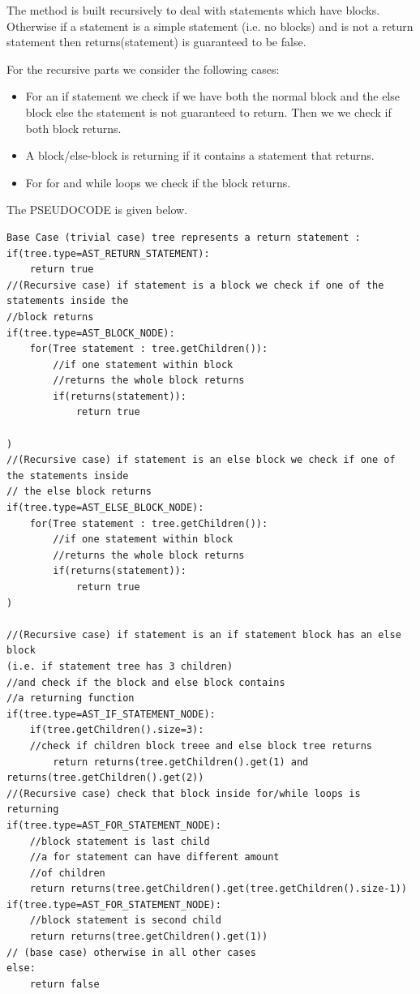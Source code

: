 The method is built recursively to deal with statements which have blocks. Otherwise if a statement is a simple statement (i.e. no blocks) and is not a return statement then returns(statement) is guaranteed to be false.

For the recursive parts we consider the following cases:
\begin{itemize}
    \item For an if statement we check if we have both the normal block and the else block else the statement is not guaranteed to return. Then we we check if both block returns.
    \item A block/else-block is returning if it contains a statement that returns.
    \item For for and while loops we check if the block returns.
\end{itemize}


The PSEUDOCODE is given below.

\begin{lstlisting}[caption=PSEUDOCODE: \textbf{Defining predicate \emph{returns(Tree tree)}}]
Base Case (trivial case) tree represents a return statement :
if(tree.type=AST_RETURN_STATEMENT):
    return true
//(Recursive case) if statement is a block we check if one of the statements inside the
//block returns
if(tree.type=AST_BLOCK_NODE):
    for(Tree statement : tree.getChildren()):
        //if one statement within block
        //returns the whole block returns
        if(returns(statement)):
            return true
        
)
//(Recursive case) if statement is an else block we check if one of the statements inside
// the else block returns
if(tree.type=AST_ELSE_BLOCK_NODE):
    for(Tree statement : tree.getChildren()):
        //if one statement within block
        //returns the whole block returns
        if(returns(statement)):
            return true
)

//(Recursive case) if statement is an if statement block has an else block
(i.e. if statement tree has 3 children)
//and check if the block and else block contains
//a returning function
if(tree.type=AST_IF_STATEMENT_NODE):
    if(tree.getChildren().size=3):
    //check if children block treee and else block tree returns
        return returns(tree.getChildren().get(1) and returns(tree.getChildren().get(2))
//(Recursive case) check that block inside for/while loops is returning 
if(tree.type=AST_FOR_STATEMENT_NODE):
    //block statement is last child 
    //a for statement can have different amount 
    //of children
    return returns(tree.getChildren().get(tree.getChildren().size-1))
if(tree.type=AST_FOR_STATEMENT_NODE):
    //block statement is second child
    return returns(tree.getChildren().get(1))
// (base case) otherwise in all other cases 
else:
    return false
\end{lstlisting}





